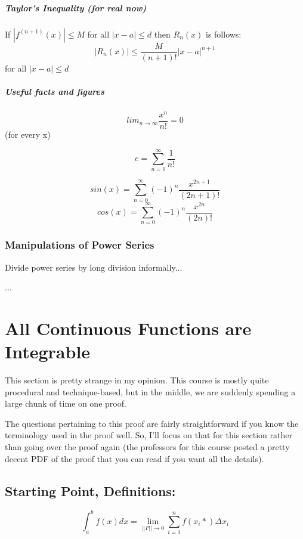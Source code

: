 \documentclass[a4paper,12pt]{report}
\begin{document}
\paragraph{Taylor's Inequality (for real now)}
If $|f^{(n+1)}(x)| 	\leq M$ for all $|x-a| \leq d$ then $R_n(x)$ is follows:
$$|R_n(x)| \leq \frac{M}{(n+1)!} |x-a|^{n+1}$$ for all $|x-a| \leq d$

\paragraph{Useful facts and figures}
$$lim_{n \to \infty} \frac{x^n}{n!} = 0$$
(for every x)


$$e = \sum_{n = 0}^{\infty} \frac{1}{n!}$$

$$sin(x) = \sum_{n=0}^{\infty}(-1)^n \frac{x^{2n+1}}{(2n+1)!}$$
$$cos(x) = \sum_{n=0}^{\infty}(-1)^n \frac{x^{2n}}{(2n)!}$$

\subsection{Manipulations of Power Series}
Divide power series by long division informally...

...

\chapter{All Continuous Functions are Integrable}
This section is pretty strange in my opinion. This course is mostly quite procedural and technique-based, but in the middle, we are suddenly spending a large chunk of time on one proof.

The questions pertaining to this proof are fairly straightforward if you know the terminology used in the proof well. So, I'll focus on that for this section rather than going over the proof again (the professors for this course posted a pretty decent PDF of the proof that you can read if you want all the details). 

\section{Starting Point, Definitions: }
$$\int_a^b f(x) dx = \lim_{||P|| \to 0} \sum_{i=1}^{n} f(x_i*)\Delta x_i$$
\end{document}
